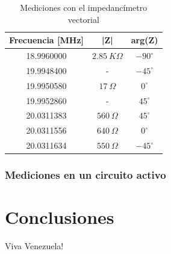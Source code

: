 \documentclass[a4paper,10pt]{article}
\begin{document}
		\begin{table}[!htp]
			\centering
			\begin{tabular}{|c|c|c|}
				\hline
				Frecuencia [MHz] & |Z| & arg(Z) \\
				\hline
				18.9960000 & $2.85~K\Omega$ & $-90^{\circ}$ \\
				\hline
				19.9948400 & - & $-45^{\circ}$ \\ 
				\hline
				19.9950580 & $17~\Omega$ & $0^{\circ}$ \\
				\hline
				19.9952860 & - & $45^{\circ}$ \\ 
				\hline									
				20.0311383 & $560~\Omega$ & $45^{\circ}$ \\
				\hline									
				20.0311556 & $640~\Omega$ & $0^{\circ}$ \\
				\hline									
				20.0311634 & $550~\Omega$ & $-45^{\circ}$ \\
				\hline									
			\end{tabular}
			\caption{Mediciones con el impedancímetro vectorial} \label{tab003}
		\end{table}	

		\subsubsection{Mediciones en un circuito activo}
			
	\section{Conclusiones}
	\indent Viva Venezuela!\\
\end{document}
